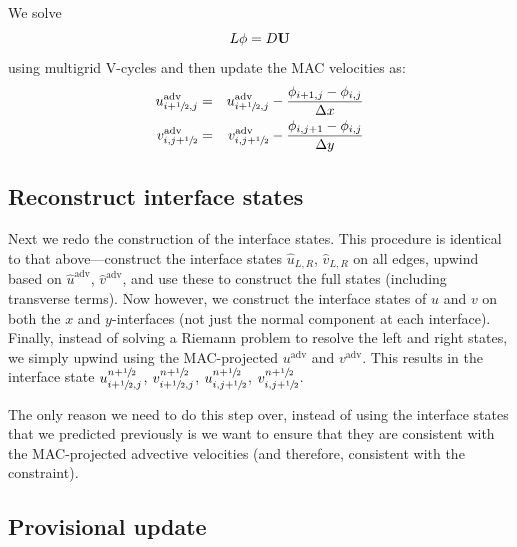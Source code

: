 We solve
\begin{equation}
L\phi = D{\bf U}
\end{equation}
using multigrid V-cycles and then update the MAC velocities as:
\begin{eqnarray}
u^\mathrm{adv}_{i+\myhalf,j} &=& u^\mathrm{adv}_{i+\myhalf,j} - 
    \frac{\phi_{i+1,j} - \phi_{i,j}}{\Delta x} \\
%
v^\mathrm{adv}_{i,j+\myhalf} &=& v^\mathrm{adv}_{i,j+\myhalf} - 
    \frac{\phi_{i,j+1} - \phi_{i,j}}{\Delta y}
\end{eqnarray}


\subsection{Reconstruct interface states}

Next we redo the construction of the interface states.  This procedure
is identical to that above---construct the interface states
$\hat{u}_{L,R}$, $\hat{v}_{L,R}$ on all edges, upwind based on
$\hat{u}^\mathrm{adv}$, $\hat{v}^\mathrm{adv}$, and use these to
construct the full states (including transverse terms).  Now however,
we construct the interface states of $u$ and $v$ on both the $x$ and
$y$-interfaces (not just the normal component at each interface).
Finally, instead of solving a Riemann problem to resolve the left and
right states, we simply upwind using the MAC-projected
$u^\mathrm{adv}$ and $v^\mathrm{adv}$.  This results in the interface
state $u^{n+{\sfrac{1}{2}}}_{i+{\sfrac{1}{2}},j}$, $v^{n+{\sfrac{1}{2}}}_{i+{\sfrac{1}{2}},j}$, $u^{n+{\sfrac{1}{2}}}_{i,j+{\sfrac{1}{2}}}$,
$v^{n+{\sfrac{1}{2}}}_{i,j+{\sfrac{1}{2}}}$.

The only reason we need to do this step over, instead of using the
interface states that we predicted previously is we want to ensure
that they are consistent with the MAC-projected advective velocities
(and therefore, consistent with the constraint).

\subsection{Provisional update}

